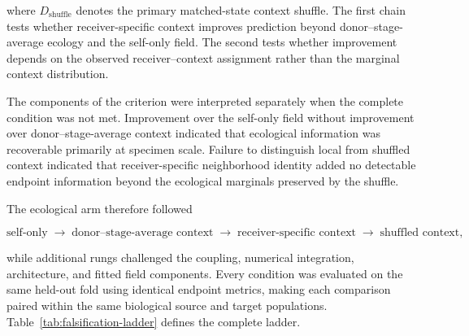where \(D_{\mathrm{shuffle}}\) denotes the primary matched-state context
shuffle. The first chain tests whether receiver-specific context improves
prediction beyond donor--stage-average ecology and the self-only field. The
second tests whether improvement depends on the observed receiver--context
assignment rather than the marginal context distribution.

The components of the criterion were interpreted separately when the complete
condition was not met. Improvement over the self-only field without improvement
over donor--stage-average context indicated that ecological information was
recoverable primarily at specimen scale. Failure to distinguish local from
shuffled context indicated that receiver-specific neighborhood identity added
no detectable endpoint information beyond the ecological marginals preserved
by the shuffle.

The ecological arm therefore followed

\begin{equation}
\text{self-only}
\;\longrightarrow\;
\text{donor--stage-average context}
\;\longrightarrow\;
\text{receiver-specific context}
\;\longrightarrow\;
\text{shuffled context},
\label{eq:methods-context-ladder}
\end{equation}

while additional rungs challenged the coupling, numerical integration,
architecture, and fitted field components. Every condition was evaluated on
the same held-out fold using identical endpoint metrics, making each comparison
paired within the same biological source and target populations.
Table~\ref{tab:falsification-ladder} defines the complete ladder.

